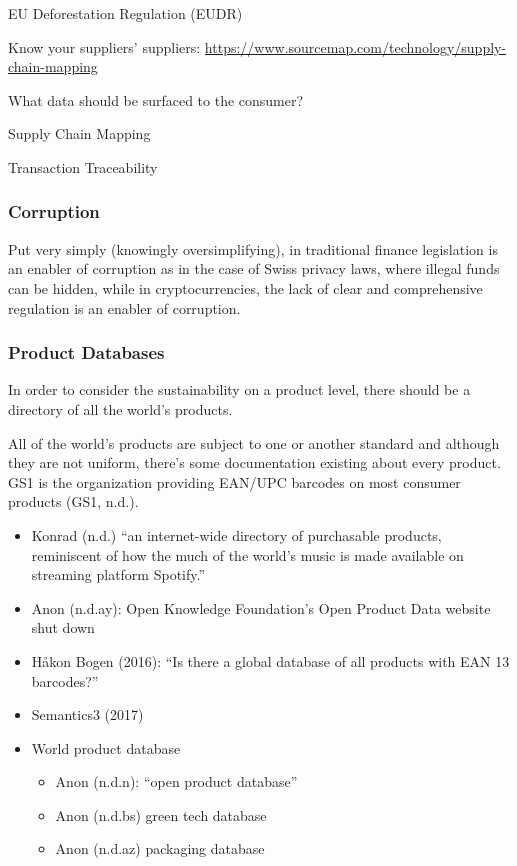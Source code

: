 \documentclass[
  letterpaper,
  DIV=11,
  numbers=noendperiod]{scrartcl}
\begin{document}
EU Deforestation Regulation (EUDR)

Know your suppliers' suppliers:
\url{https://www.sourcemap.com/technology/supply-chain-mapping}

What data should be surfaced to the consumer?

Supply Chain Mapping

Transaction Traceability

\subsubsection{Corruption}\label{corruption}

Put very simply (knowingly oversimplifying), in traditional finance
legislation is an enabler of corruption as in the case of Swiss privacy
laws, where illegal funds can be hidden, while in cryptocurrencies, the
lack of clear and comprehensive regulation is an enabler of corruption.

\subsubsection{Product Databases}\label{product-databases}

In order to consider the sustainability on a product level, there should
be a directory of all the world's products.

All of the world's products are subject to one or another standard and
although they are not uniform, there's some documentation existing about
every product. GS1 is the organization providing EAN/UPC barcodes on
most consumer products (GS1, n.d.).

\begin{itemize}
\item
  Konrad (n.d.) ``an internet-wide directory of purchasable products,
  reminiscent of how the much of the world's music is made available on
  streaming platform Spotify.''
\item
  Anon (n.d.ay): Open Knowledge Foundation's Open Product Data website
  shut down
\item
  Håkon Bogen (2016): ``Is there a global database of all products with
  EAN 13 barcodes?''
\item
  Semantics3 (2017)
\item
  World product database

  \begin{itemize}
  \item
    Anon (n.d.n): ``open product database''
  \item
    Anon (n.d.bs) green tech database
  \item
    Anon (n.d.az) packaging database
  \end{itemize}
\end{itemize}
\end{document}
